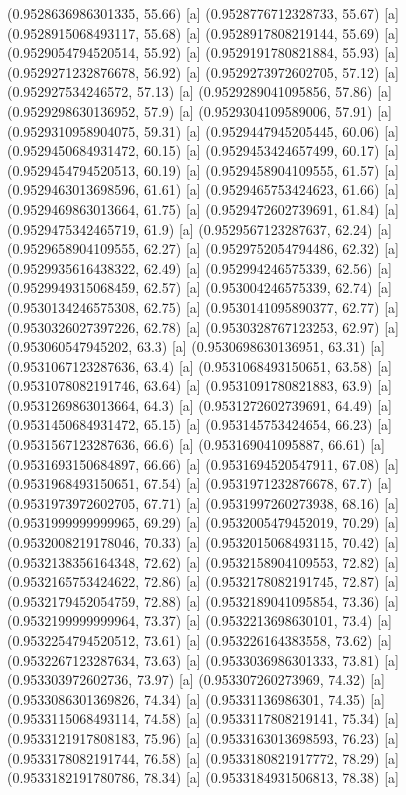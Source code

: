{{{(0.9528636986301335, 55.66) [a] 
(0.9528776712328733, 55.67) [a] 
(0.9528915068493117, 55.68) [a] 
(0.9528917808219144, 55.69) [a] 
(0.9529054794520514, 55.92) [a] 
(0.9529191780821884, 55.93) [a] 
(0.9529271232876678, 56.92) [a] 
(0.9529273972602705, 57.12) [a] 
(0.952927534246572, 57.13) [a] 
(0.9529289041095856, 57.86) [a] 
(0.9529298630136952, 57.9) [a] 
(0.9529304109589006, 57.91) [a] 
(0.9529310958904075, 59.31) [a] 
(0.9529447945205445, 60.06) [a] 
(0.9529450684931472, 60.15) [a] 
(0.9529453424657499, 60.17) [a] 
(0.9529454794520513, 60.19) [a] 
(0.9529458904109555, 61.57) [a] 
(0.9529463013698596, 61.61) [a] 
(0.9529465753424623, 61.66) [a] 
(0.9529469863013664, 61.75) [a] 
(0.9529472602739691, 61.84) [a] 
(0.9529475342465719, 61.9) [a] 
(0.9529567123287637, 62.24) [a] 
(0.9529658904109555, 62.27) [a] 
(0.9529752054794486, 62.32) [a] 
(0.9529935616438322, 62.49) [a] 
(0.952994246575339, 62.56) [a] 
(0.9529949315068459, 62.57) [a] 
(0.953004246575339, 62.74) [a] 
(0.9530134246575308, 62.75) [a] 
(0.9530141095890377, 62.77) [a] 
(0.9530326027397226, 62.78) [a] 
(0.9530328767123253, 62.97) [a] 
(0.953060547945202, 63.3) [a] 
(0.9530698630136951, 63.31) [a] 
(0.9531067123287636, 63.4) [a] 
(0.9531068493150651, 63.58) [a] 
(0.9531078082191746, 63.64) [a] 
(0.9531091780821883, 63.9) [a] 
(0.9531269863013664, 64.3) [a] 
(0.9531272602739691, 64.49) [a] 
(0.9531450684931472, 65.15) [a] 
(0.953145753424654, 66.23) [a] 
(0.9531567123287636, 66.6) [a] 
(0.953169041095887, 66.61) [a] 
(0.9531693150684897, 66.66) [a] 
(0.9531694520547911, 67.08) [a] 
(0.9531968493150651, 67.54) [a] 
(0.9531971232876678, 67.7) [a] 
(0.9531973972602705, 67.71) [a] 
(0.9531997260273938, 68.16) [a] 
(0.9531999999999965, 69.29) [a] 
(0.9532005479452019, 70.29) [a] 
(0.9532008219178046, 70.33) [a] 
(0.9532015068493115, 70.42) [a] 
(0.9532138356164348, 72.62) [a] 
(0.9532158904109553, 72.82) [a] 
(0.9532165753424622, 72.86) [a] 
(0.9532178082191745, 72.87) [a] 
(0.9532179452054759, 72.88) [a] 
(0.9532189041095854, 73.36) [a] 
(0.9532199999999964, 73.37) [a] 
(0.9532213698630101, 73.4) [a] 
(0.9532254794520512, 73.61) [a] 
(0.953226164383558, 73.62) [a] 
(0.9532267123287634, 73.63) [a] 
(0.9533036986301333, 73.81) [a] 
(0.953303972602736, 73.97) [a] 
(0.953307260273969, 74.32) [a] 
(0.9533086301369826, 74.34) [a] 
(0.95331136986301, 74.35) [a] 
(0.9533115068493114, 74.58) [a] 
(0.9533117808219141, 75.34) [a] 
(0.9533121917808183, 75.96) [a] 
(0.9533163013698593, 76.23) [a] 
(0.9533178082191744, 76.58) [a] 
(0.9533180821917772, 78.29) [a] 
(0.9533182191780786, 78.34) [a] 
(0.9533184931506813, 78.38) [a] 
}}}
